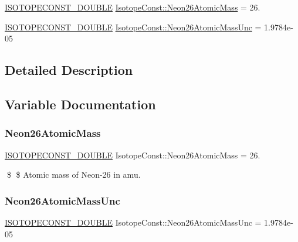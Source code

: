 \begin{DoxyCompactItemize}
\item 
\mbox{\hyperlink{group___isotope_const-_macros_ga8f45a7272ce02c0b4c65c44636ed719a}{I\+S\+O\+T\+O\+P\+E\+C\+O\+N\+S\+T\+\_\+\+D\+O\+U\+B\+LE}} \mbox{\hyperlink{group___isotope_const-_neon-_ne26_ga77b7884ac96b5df9b6854becbcdbdcaa}{Isotope\+Const\+::\+Neon26\+Atomic\+Mass}} = 26.
\item 
\mbox{\hyperlink{group___isotope_const-_macros_ga8f45a7272ce02c0b4c65c44636ed719a}{I\+S\+O\+T\+O\+P\+E\+C\+O\+N\+S\+T\+\_\+\+D\+O\+U\+B\+LE}} \mbox{\hyperlink{group___isotope_const-_neon-_ne26_ga628a861861522176ea240d67e50a5c16}{Isotope\+Const\+::\+Neon26\+Atomic\+Mass\+Unc}} = 1.\+9784e-\/05
\end{DoxyCompactItemize}


\subsection{Detailed Description}


\subsection{Variable Documentation}
\mbox{\label{group___isotope_const-_neon-_ne26_ga77b7884ac96b5df9b6854becbcdbdcaa}} 
\subsubsection{\texorpdfstring{Neon26\+Atomic\+Mass}{Neon26AtomicMass}}
{\footnotesize\ttfamily \mbox{\hyperlink{group___isotope_const-_macros_ga8f45a7272ce02c0b4c65c44636ed719a}{I\+S\+O\+T\+O\+P\+E\+C\+O\+N\+S\+T\+\_\+\+D\+O\+U\+B\+LE}} Isotope\+Const\+::\+Neon26\+Atomic\+Mass = 26.}

\$ \$ Atomic mass of Neon-\/26 in amu. \mbox{\label{group___isotope_const-_neon-_ne26_ga628a861861522176ea240d67e50a5c16}} 
\subsubsection{\texorpdfstring{Neon26\+Atomic\+Mass\+Unc}{Neon26AtomicMassUnc}}
{\footnotesize\ttfamily \mbox{\hyperlink{group___isotope_const-_macros_ga8f45a7272ce02c0b4c65c44636ed719a}{I\+S\+O\+T\+O\+P\+E\+C\+O\+N\+S\+T\+\_\+\+D\+O\+U\+B\+LE}} Isotope\+Const\+::\+Neon26\+Atomic\+Mass\+Unc = 1.\+9784e-\/05}

